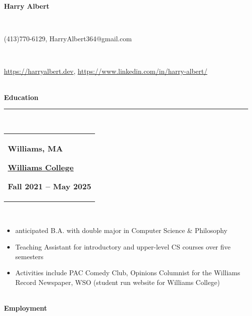 \documentclass[9pt]{extarticle}
\begin{document}
\thispagestyle{empty}
\vspace{-\baselineskip}
\begin{center}
\Large \textbf{Harry Albert}
\end{center}
\vspace{-6.5ex}~\\ 
\vspace{-\baselineskip}
\begin{center}
\normalsize (413)770-6129, HarryAlbert364@gmail.com
\end{center}
\vspace{-6ex}~\\ 
\vspace{-\baselineskip}
\begin{center}
\normalsize \url{https://harryalbert.dev}, \url{https://www.linkedin.com/in/harry-albert/}
\end{center}
\vspace{-6ex}~\\ 
\textbf{Education}\\[-2ex]
\rule{\textwidth}{0.4pt}\\ 
\begin{tabular}{@{}p{\textwidth}}\begin{minipage}[t]{0.333\textwidth}
\raggedright
\textbf{Williams, MA}
\end{minipage}%
\begin{minipage}[t]{0.333\textwidth}
\centering
\textbf{\underline{Williams College}}
\end{minipage}%
\begin{minipage}[t]{0.333\textwidth}
\raggedleft
\textbf{Fall 2021 – May 2025}
\end{minipage}%
\end{tabular}\\[0.5ex]
\vspace{-\baselineskip}
\begin{itemize}[itemsep=0pt, topsep=0pt]
\item anticipated B.A. with double major in Computer Science \& Philosophy
\item Teaching Assistant for introductory and upper-level CS courses over five semesters
\item Activities include PAC Comedy Club, Opinions Columnist for the Williams Record Newspaper, WSO (student run website for Williams College)
\end{itemize}~\\[-1ex]
\textbf{Employment}\\[-2ex]
\end{document}
